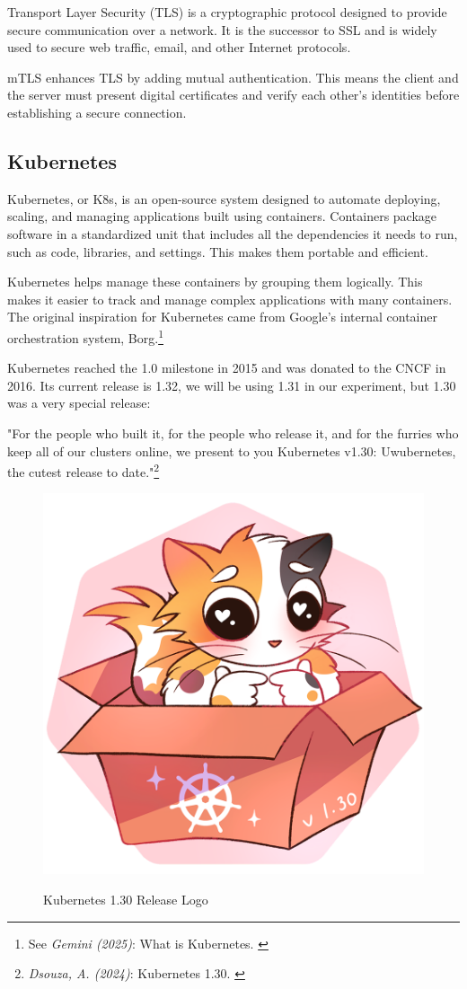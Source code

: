 Transport Layer Security (TLS) is a cryptographic protocol designed to provide secure communication over a network. It is the successor to SSL and is widely used to secure web traffic, email, and other Internet protocols.

mTLS enhances TLS by adding mutual authentication. This means the client and the server must present digital certificates and verify each other's identities before establishing a secure connection.

\subsection{Kubernetes}

Kubernetes, or K8s, is an open-source system designed to automate deploying, scaling, and managing applications built using containers. Containers package software in a standardized unit that includes all the dependencies it needs to run, such as code, libraries, and settings. This makes them portable and efficient.

Kubernetes helps manage these containers by grouping them logically. This makes it easier to track and manage complex applications with many containers. The original inspiration for Kubernetes came from Google's internal container orchestration system, Borg.\footnote{See \textit{Gemini (2025)}: What is Kubernetes. \cite{bardKubernetes}} 

Kubernetes reached the 1.0 milestone in 2015 and was donated to the CNCF in 2016. Its current release is 1.32, we will be using 1.31 in our experiment, but 1.30 was a very special release:

"For the people who built it, for the people who release it, and for the furries who keep all of our clusters online, we present to you Kubernetes v1.30: Uwubernetes, the cutest release to date."\footnote{\textit{Dsouza, A. (2024)}: Kubernetes 1.30. \cite{uwubernetes}}

\begin{figure}[H]
\centering
\caption {Kubernetes 1.30 Release Logo}
\includegraphics[width=0.3\linewidth]{images/k8s-1.30.png}
\label{fig:uwubernetes}
\end{figure}

